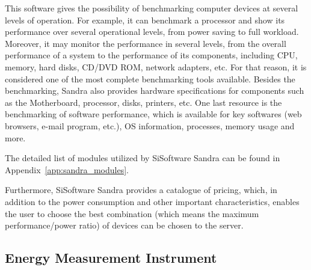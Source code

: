     This software gives the possibility of benchmarking computer devices at several levels of operation. For example, it can benchmark a processor and show its performance over several operational levels, from power saving to full workload. Moreover, it may monitor the performance in several levels, from the overall performance of a system to the performance of its components, including CPU, memory, hard disks, CD/DVD ROM, network adapters, etc. For that reason, it is considered one of the most complete benchmarking tools available. Besides the benchmarking, Sandra also provides hardware specifications for components such as the Motherboard, processor, disks, printers, etc. One last resource is the benchmarking of software performance, which is available for key softwares (web browsers, e-mail program, etc.), OS information, processes, memory usage and more.
    
    The detailed list of modules utilized by SiSoftware Sandra can be found in Appendix~\ref{app:sandra_modules}.
    
    Furthermore, SiSoftware Sandra provides a catalogue of pricing, which, in addition to the power consumption and other important characteristics, enables the user to choose the best combination (which means the maximum performance/power ratio) of devices can be chosen to the server.
    
    \subsection{Energy Measurement Instrument} \label{sec3:energy_measurement_instrument}

